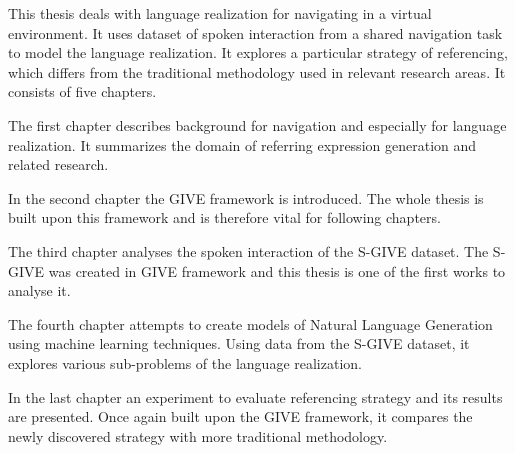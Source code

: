 This thesis deals with language realization for navigating in a virtual environment. It uses dataset of spoken interaction from a shared navigation task to model the language realization. It explores a particular strategy of referencing, which differs from the traditional methodology used in relevant research areas. It consists of five chapters.

The first chapter describes background for navigation and especially for language realization. It summarizes the domain of referring expression generation and related research.

In the second chapter the GIVE framework is introduced. The whole thesis is built upon this framework and is therefore vital for following chapters. 

The third chapter analyses the spoken interaction of the S-GIVE dataset. The S-GIVE was created in GIVE framework and this thesis is one of the first works to analyse it.

The fourth chapter attempts to create models of Natural Language Generation using machine learning techniques. Using data from the S-GIVE dataset, it explores various sub-problems of the language realization.

In the last chapter an experiment to evaluate referencing strategy and its results are presented. Once again built upon the GIVE framework, it compares the newly discovered strategy with more traditional methodology.   